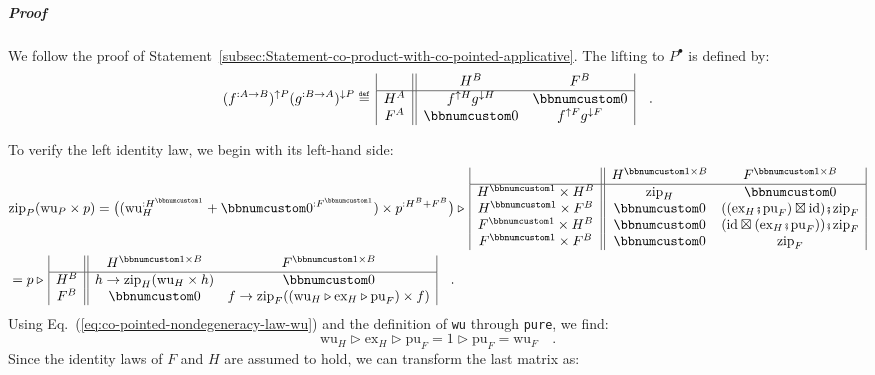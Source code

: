 \subparagraph{Proof}

We follow the proof of Statement~\ref{subsec:Statement-co-product-with-co-pointed-applicative}.
The lifting to $P^{\bullet}$ is defined by:
\[
(f^{:A\rightarrow B})^{\uparrow P}(g^{:B\rightarrow A})^{\downarrow P}\triangleq\,\begin{array}{|c||cc|}
 & H^{B} & F^{B}\\
\hline H^{A} & f^{\uparrow H}g^{\downarrow H} & \bbnum 0\\
F^{A} & \bbnum 0 & f^{\uparrow F}g^{\downarrow F}
\end{array}\quad.
\]

To verify the left identity law, we begin with its left-hand side:
\begin{align*}
 & \text{zip}_{P}(\text{wu}_{P}\times p)=\big((\text{wu}_{H}^{:H^{\bbnum 1}}+\bbnum 0^{:F^{\bbnum 1}})\times p^{:H^{B}+F^{B}}\big)\triangleright\,\begin{array}{|c||cc|}
 & H^{\bbnum 1\times B} & F^{\bbnum 1\times B}\\
\hline H^{\bbnum 1}\times H^{B} & \text{zip}_{H} & \bbnum 0\\
H^{\bbnum 1}\times F^{B} & \bbnum 0 & ((\text{ex}_{H}\bef\text{pu}_{F})\boxtimes\text{id})\bef\text{zip}_{F}\\
F^{\bbnum 1}\times H^{B} & \bbnum 0 & (\text{id}\boxtimes(\text{ex}_{H}\bef\text{pu}_{F}))\bef\text{zip}_{F}\\
F^{\bbnum 1}\times F^{B} & \bbnum 0 & \text{zip}_{F}
\end{array}\\
 & =p\triangleright\,\begin{array}{|c||cc|}
 & H^{\bbnum 1\times B} & F^{\bbnum 1\times B}\\
\hline H^{B} & h\rightarrow\text{zip}_{H}(\text{wu}_{H}\times h) & \bbnum 0\\
F^{B} & \bbnum 0 & f\rightarrow\text{zip}_{F}((\text{wu}_{H}\triangleright\text{ex}_{H}\triangleright\text{pu}_{F})\times f)
\end{array}\quad.
\end{align*}
Using Eq.~(\ref{eq:co-pointed-nondegeneracy-law-wu}) and the definition
of \lstinline!wu! through \lstinline!pure!, we find:
\[
\text{wu}_{H}\triangleright\text{ex}_{H}\triangleright\text{pu}_{F}=1\triangleright\text{pu}_{F}=\text{wu}_{F}\quad.
\]
Since the identity laws of $F$ and $H$ are assumed to hold, we can
transform the last matrix as:
